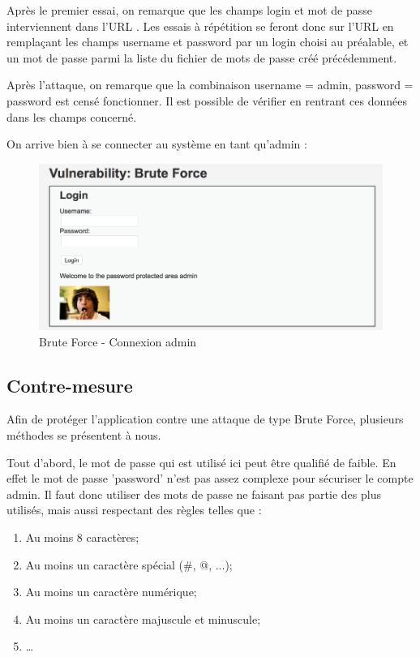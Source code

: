 Après le premier essai, on remarque que les champs login et mot de passe interviennent dans l'URL . Les essais à répétition se feront donc sur l'URL en remplaçant les champs username et password par un login choisi au préalable, et un mot de passe parmi la liste du fichier de mots de passe créé précédemment.

Après l'attaque, on remarque que la combinaison username = admin, password = password est censé fonctionner. Il est possible de vérifier en rentrant ces données dans les champs concerné.


On arrive bien à se connecter au système en tant qu'admin :

\begin{figure}[!h]
\begin{center}


\includegraphics[scale=0.48]{images/bf1_1.png}

\caption{Brute Force - Connexion admin}
\label{inclusion}
\end{center}
\end{figure}

\subsection{Contre-mesure}

Afin de protéger l'application contre une attaque de type Brute Force, plusieurs méthodes se présentent à nous.

Tout d'abord, le mot de passe qui est utilisé ici peut être qualifié de faible. En effet le mot de passe 'password' n'est pas assez complexe pour sécuriser le compte admin. Il faut donc utiliser des mots de passe ne faisant pas partie des plus utilisés, mais aussi respectant des règles telles que :
\begin{enumerate}
\item Au moins 8 caractères;
\item Au moins un caractère spécial (\#, @, ...);
\item Au moins un caractère numérique;
\item Au moins un caractère majuscule et minuscule;
\item …
\end{enumerate}

